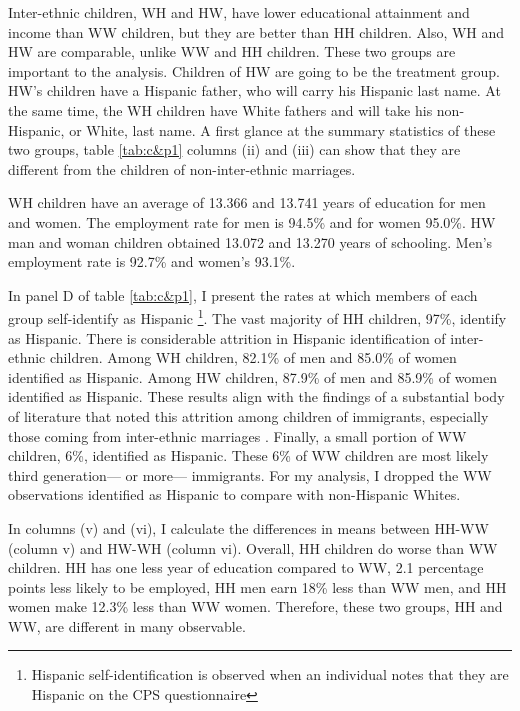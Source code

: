 \documentclass[12pt, fullpage]{article}
\begin{document}
Inter-ethnic children, WH and HW, have lower educational attainment and income than WW children, but they are better than HH children. Also, WH and HW are comparable, unlike WW and HH children. These two groups are important to the analysis. Children of HW are going to be the treatment group. HW's children have a Hispanic father, who will carry his Hispanic last name. At the same time, the WH children have White fathers and will take his non-Hispanic, or White, last name. A first glance at the summary statistics of these two groups, table \ref{tab:c&p1} columns (ii) and (iii) can show that they are different from the children of non-inter-ethnic marriages. 



\newpage




WH children have an average of 13.366 and 13.741 years of education for men and women. The employment rate for men is 94.5\% and for women 95.0\%. HW man and woman children obtained 13.072 and 13.270 years of schooling. Men's employment rate is 92.7\% and women's 93.1\%.

In panel D of table \ref{tab:c&p1}, I present the rates at which members of each group self-identify as Hispanic \footnote{Hispanic self-identification is observed when an individual notes that they are Hispanic on the CPS questionnaire}. The vast majority of HH children, 97\%, identify as Hispanic. There is considerable attrition in Hispanic identification of inter-ethnic children. Among WH children, 82.1\% of men and 85.0\% of women identified as Hispanic. Among HW children, 87.9\% of men and 85.9\% of women identified as Hispanic. These results align with the findings of a substantial body of literature that noted this attrition among children of immigrants, especially those coming from inter-ethnic marriages \citep{duncan2017complexity, duncan2018identifying, duncan2020new, antman2020ethnic}. Finally, a small portion of WW children, 6\%, identified as Hispanic. These 6\% of WW children are most likely third generation--- or more--- immigrants. For my analysis, I dropped the WW observations identified as Hispanic to compare with non-Hispanic Whites.

In columns (v) and (vi), I calculate the differences in means between HH-WW (column v) and HW-WH (column vi). Overall, HH children do worse than WW children. HH has one less year of education compared to WW, 2.1 percentage points less likely to be employed, HH men earn 18\% less than WW men, and HH women make 12.3\% less than WW women. Therefore, these two groups, HH and WW, are different in many observable.
\end{document}
